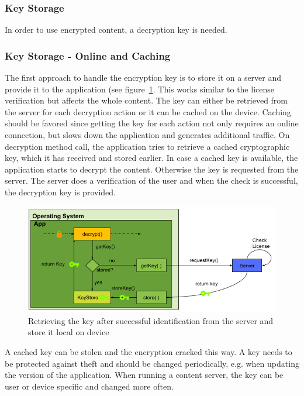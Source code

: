 \subsubsection{Key Storage} \label{section:counter-replace-encryption-key}
In order to use encrypted content, a decryption key is needed.

\subsubsection{Key Storage - Online and Caching} \label{section:counter-replace-encryption-key-online}
The first approach to handle the encryption key is to store it on a server and provide it to the application (see figure~\ref{fig:encryptionKeyServer}.
This works similar to the license verification but affects the whole content.
\newline
The key can either be retrieved from the server for each decryption action or it can be cached on the device.
Caching should be favored since getting the key for each action not only requires an online connection, but slows down the application and generates additional traffic.
\newline
On decryption method call, the application tries to retrieve a cached cryptographic key, which it has received and stored earlier.
In case a cached key is available, the application starts to decrypt the content.
Otherwise the key is requested from the server.
The server does a verification of the user and when the check is successful, the decryption key is provided.
\newline
\begin{figure}[h]
    \centering
    \includegraphics[width=1\textwidth]{data/encryptionKeyServer.png}
    \caption{Retrieving the key after successful identification from the server and store it local on device}
    \label{fig:encryptionKeyServer}
\end{figure}
A cached key can be stolen \cite{memoryDump} and the encryption cracked this way.
A key needs to be protected against theft and should be changed periodically, e.g. when updating the version of the application.
When running a content server, the key can be user or device specific and changed more often.

